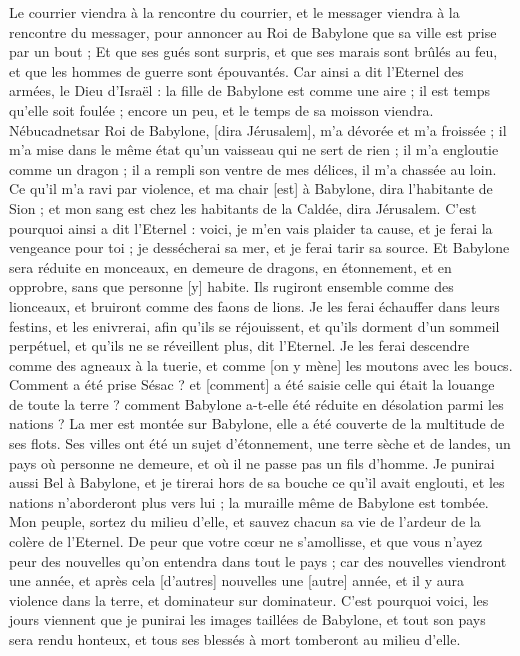 \begin{multicols}{2}
Le courrier viendra à la rencontre du courrier, et le messager viendra à la rencontre du messager, pour annoncer au Roi de Babylone que sa ville est prise par un bout ;
Et que ses gués sont surpris, et que ses marais sont brûlés au feu, et que les hommes de guerre sont épouvantés.
Car ainsi a dit l'Eternel des armées, le Dieu d'Israël : la fille de Babylone est comme une aire ; il est temps qu'elle soit foulée ; encore un peu, et le temps de sa moisson viendra.
Nébucadnetsar Roi de Babylone, [dira Jérusalem], m'a dévorée et m'a froissée ; il m'a mise dans le même état qu'un vaisseau qui ne sert de rien ; il m'a engloutie comme un dragon ; il a rempli son ventre de mes délices, il m'a chassée au loin.
Ce qu'il m'a ravi par violence, et ma chair [est] à Babylone, dira l'habitante de Sion ; et mon sang est chez les habitants de la Caldée, dira Jérusalem.
C'est pourquoi ainsi a dit l'Eternel : voici, je m'en vais plaider ta cause, et je ferai la vengeance pour toi ; je dessécherai sa mer, et je ferai tarir sa source.
Et Babylone sera réduite en monceaux, en demeure de dragons, en étonnement, et en opprobre, sans que personne [y] habite.
Ils rugiront ensemble comme des lionceaux, et bruiront comme des faons de lions.
Je les ferai échauffer dans leurs festins, et les enivrerai, afin qu'ils se réjouissent, et qu'ils dorment d'un sommeil perpétuel, et qu'ils ne se réveillent plus, dit l'Eternel.
Je les ferai descendre comme des agneaux à la tuerie, et comme [on y mène] les moutons avec les boucs.
Comment a été prise Sésac ? et [comment] a été saisie celle qui était la louange de toute la terre ? comment Babylone a-t-elle été réduite en désolation parmi les nations ?
La mer est montée sur Babylone, elle a été couverte de la multitude de ses flots.
Ses villes ont été un sujet d'étonnement, une terre sèche et de landes, un pays où personne ne demeure, et où il ne passe pas un fils d'homme.
Je punirai aussi Bel à Babylone, et je tirerai hors de sa bouche ce qu'il avait englouti, et les nations n'aborderont plus vers lui ; la muraille même de Babylone est tombée.
Mon peuple, sortez du milieu d'elle, et sauvez chacun sa vie de l'ardeur de la colère de l'Eternel.
De peur que votre cœur ne s'amollisse, et que vous n'ayez peur des nouvelles qu'on entendra dans tout le pays ; car des nouvelles viendront une année, et après cela [d'autres] nouvelles une [autre] année, et il y aura violence dans la terre, et dominateur sur dominateur.
C'est pourquoi voici, les jours viennent que je punirai les images taillées de Babylone, et tout son pays sera rendu honteux, et tous ses blessés à mort tomberont au milieu d'elle.

\end{multicols}
